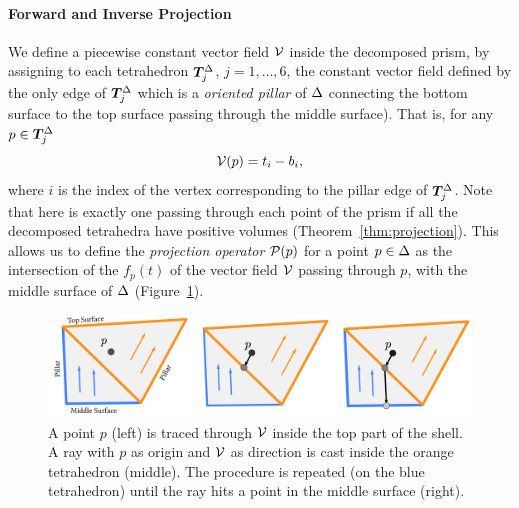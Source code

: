 \paragraph{Forward and Inverse Projection}
We define a piecewise constant vector field $\V$ inside the decomposed prism,
by assigning to each tetrahedron $\Tet_j^{\Prism}$, $j=1,\hdots,6$,
the constant vector field defined by the only edge of $\Tet_j^{\Prism}$ which is a \emph{oriented pillar} of $\Prism$ connecting the bottom surface to the top surface passing through the middle surface). That is, for any $p\in \Tet_j^{\Prism}$
\begin{equation}
    \label{eq:V}
    \V(p) = t_i - b_i,
\end{equation}
where $i$ is the index of the vertex corresponding to the pillar edge of $\Tet_j^{\Prism}$.
Note that 
here is exactly one  passing through each point of the prism if
all the decomposed tetrahedra have positive volumes
(Theorem~\ref{thm:projection}). This allows us to define
the \emph{projection operator} $\P(p)$ for a point $p \in \Prism$ as the intersection of the  $f_p(t)$ of the vector field $\V$ passing through $p$, with the middle surface of $\Prism$ (Figure~\ref{prism:fig:advection}). 
%
\begin{figure}
    \includegraphics[width=\linewidth]{prism-tex/figs/projection}
    \caption{A point $p$ (left) is traced through $\V$ inside the top part of the shell. A ray with $p$ as origin and $\V$ as direction is cast inside the orange tetrahedron (middle). The procedure is repeated (on the blue tetrahedron) until the ray hits a point in the middle surface (right).}
    \label{prism:fig:advection}
    
\end{figure}
%
